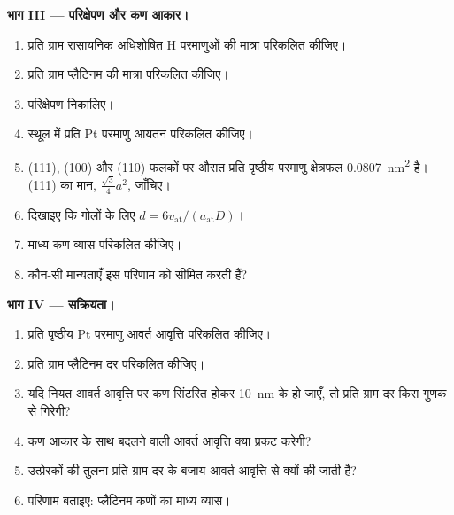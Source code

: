 \begin{problem}
\medskip\noindent\textbf{भाग III --- परिक्षेपण और कण आकार।}
\begin{enumerate}[resume]
  \item प्रति ग्राम रासायनिक अधिशोषित H परमाणुओं की मात्रा परिकलित कीजिए।
  \item प्रति ग्राम प्लैटिनम की मात्रा परिकलित कीजिए।
  \item परिक्षेपण निकालिए।
  \item स्थूल में प्रति Pt परमाणु आयतन परिकलित कीजिए।
  \item (111), (100) और (110) फलकों पर औसत प्रति पृष्ठीय परमाणु क्षेत्रफल
        \qty{0.0807}{nm^2} है। (111) का मान, $\frac{\sqrt3}{4}a^2$, जाँचिए।
  \item दिखाइए कि गोलों के लिए $d = 6v_{\mathrm{at}}/(a_{\mathrm{at}}D)$।
  \item माध्य कण व्यास परिकलित कीजिए।
  \item कौन-सी मान्यताएँ इस परिणाम को सीमित करती हैं?
\end{enumerate}

\medskip\noindent\textbf{भाग IV --- सक्रियता।}
\begin{enumerate}[resume]
  \item प्रति पृष्ठीय Pt परमाणु आवर्त आवृत्ति परिकलित कीजिए।
  \item प्रति ग्राम प्लैटिनम दर परिकलित कीजिए।
  \item यदि नियत आवर्त आवृत्ति पर कण सिंटरित होकर \qty{10}{nm} के हो जाएँ, तो प्रति ग्राम दर
        किस गुणक से गिरेगी?
  \item कण आकार के साथ बदलने वाली आवर्त आवृत्ति क्या प्रकट करेगी?
  \item उत्प्रेरकों की तुलना प्रति ग्राम दर के बजाय आवर्त आवृत्ति से क्यों की जाती
        है?
  \item परिणाम बताइए: प्लैटिनम कणों का माध्य व्यास।
\end{enumerate}
\end{problem}
